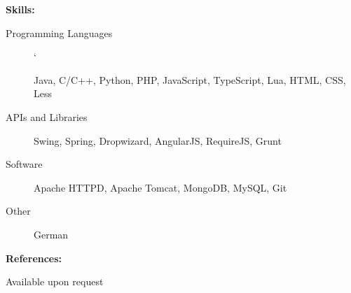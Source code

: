 \documentclass[11pt]{article}
\begin{document}
\smallskip
\clearpage
\hrulefill
\bigskip
{\Large \bf Skills:}
\begin{description}
\item[Programming Languages]
\hfill`

Java, C/C++, Python, PHP, JavaScript, TypeScript, Lua, HTML, CSS, Less

\item[APIs and Libraries]
\hfill

Swing, Spring, Dropwizard, AngularJS, RequireJS, Grunt

\item[Software]
\hfill

Apache HTTPD, Apache Tomcat, MongoDB, MySQL, Git

\item[Other]
\hfill

German
\end{description}
\smallskip
\hrulefill
\bigskip
{\Large \bf References:}
\begin{description}
\item[Available upon request]
\end{description}
\end{document}
